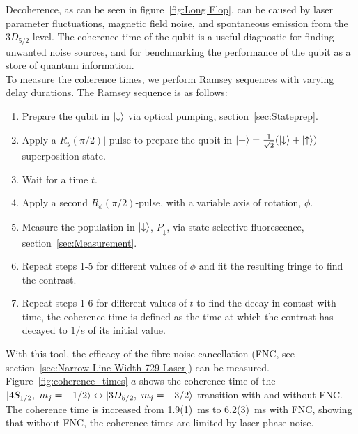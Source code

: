     Decoherence, as can be seen in figure~\ref{fig:Long Flop}, can be caused by laser parameter fluctuations, magnetic field noise, and spontaneous emission from the $3D_{5/2}$ level. The coherence time of the qubit is a useful diagnostic for finding unwanted noise sources, and for benchmarking the performance of the qubit as a store of quantum information.\\
    To measure the coherence times, we perform Ramsey sequences with varying delay durations. The Ramsey sequence is as follows:
    \begin{enumerate}
        \item Prepare the qubit in $\ket{\downarrow}$ via optical pumping, section~\ref{sec:Stateprep}.
        \item Apply a $R_y(\pi/2)|$-pulse to prepare the qubit in $\ket{+} = \frac{1}{\sqrt{2}}(\ket{\downarrow} + \ket{\uparrow})$ superposition state.
        \item Wait for a time $t$.
        \item Apply a second $R_\phi(\pi/2)$-pulse, with a variable axis of rotation, $\phi$. 
        \item Measure the population in $\ket{\downarrow}$, $P_\downarrow$, via state-selective fluorescence, section~\ref{sec:Measurement}.
        \item Repeat steps 1-5 for different values of $\phi$ and fit the resulting fringe to find the contrast.
        \item Repeat steps 1-6 for different values of $t$ to find the decay in contast with time, the coherence time is defined as the time at which the contrast has decayed to $1/e$ of its initial value.
    \end{enumerate}
    With this tool, the efficacy of the fibre noise cancellation (FNC, see section~\ref{sec:Narrow Line Width 729 Laser}) can be measured. Figure~\ref{fig:coherence_times} $a$ shows the coherence time of the $\ket{4S_{1/2},~m_j=-1/2}\leftrightarrow\ket{3D_{5/2},~m_j=-3/2}$  transition with and without FNC. The coherence time is increased from 1.9(1)~\unit{\ms} to 6.2(3)~\unit{\ms} with FNC, showing that without FNC, the coherence times are limited by laser phase noise. \\
